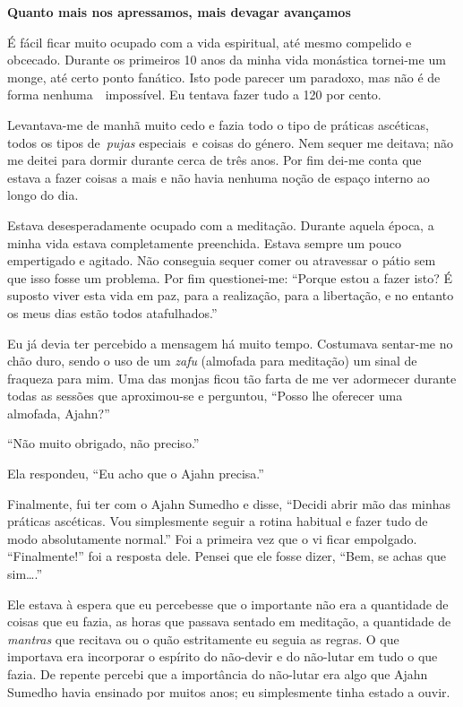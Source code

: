 \textbf{Quanto mais nos apressamos, mais devagar avançamos }

É fácil ficar muito ocupado com a vida espiritual, até mesmo compelido e
obcecado. Durante os primeiros 10 anos da minha vida monástica tornei-me
um monge, até certo ponto fanático. Isto pode parecer um paradoxo, mas
não é de forma nenhuma~~impossível. Eu tentava fazer tudo a 120 por
cento.

Levantava-me de manhã muito cedo e fazia todo o tipo de práticas
ascéticas, todos os tipos de~\emph{pujas} especiais~e coisas do género.
Nem sequer me deitava; não me deitei para dormir durante cerca de três
anos. Por fim dei-me conta que estava a fazer coisas a mais e não havia
nenhuma noção de espaço interno ao longo do dia.

Estava desesperadamente ocupado com a meditação. Durante aquela época, a
minha vida estava completamente preenchida. Estava sempre um pouco
empertigado e agitado. Não conseguia sequer comer ou atravessar o pátio
sem que isso fosse um problema. Por fim questionei-me: ``Porque estou a
fazer isto? É suposto viver esta vida em paz, para a realização, para a
libertação, e no entanto os meus dias estão todos atafulhados.''

Eu já devia ter percebido a mensagem há muito tempo. Costumava sentar-me
no chão duro, sendo o uso de um \emph{zafu} (almofada para meditação) um
sinal de fraqueza para mim. Uma das monjas ficou tão farta de me ver
adormecer durante todas as sessões que aproximou-se e perguntou, ``Posso
lhe oferecer uma almofada, Ajahn?''

``Não muito obrigado, não preciso.''

Ela respondeu, ``Eu acho que o Ajahn precisa.''

Finalmente, fui ter com o Ajahn Sumedho e disse, ``Decidi abrir mão das
minhas práticas ascéticas. Vou simplesmente seguir a rotina habitual e
fazer tudo de modo absolutamente normal.'' Foi a primeira vez que o vi
ficar empolgado. ``Finalmente!'' foi a resposta dele. Pensei que ele
fosse dizer, ``Bem, se achas que sim\ldots{}.''

Ele estava à espera que eu percebesse que o importante não era a
quantidade de coisas que eu fazia, as horas que passava sentado em
meditação, a quantidade de \emph{mantras} que recitava ou o quão
estritamente eu seguia as regras. O que importava era incorporar o
espírito do não-devir e do não-lutar em tudo o que fazia. De repente
percebi que a importância do não-lutar era algo que Ajahn Sumedho havia
ensinado por muitos anos; eu simplesmente tinha estado a ouvir.

